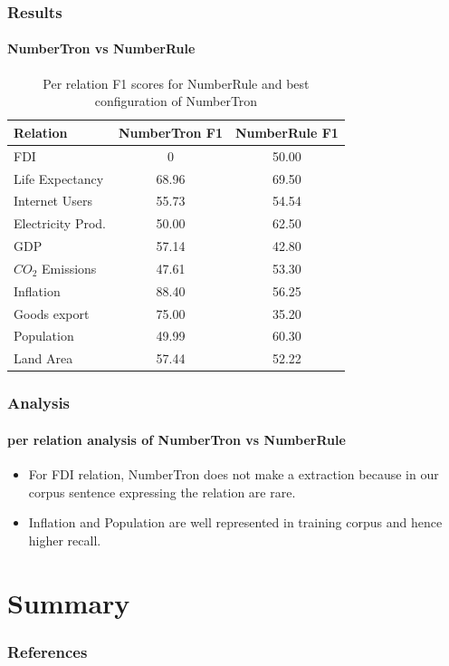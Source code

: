 \documentclass{beamer}
\begin{document}
\begin{frame}
\frametitle{Results}
\framesubtitle{NumberTron vs NumberRule}

\begin{table}
\begin{tabular}{|l|c|c|}
\hline
Relation & NumberTron F1 & NumberRule F1\\
\hline
\hline
FDI & 0 & 50.00\\
\hline
Life Expectancy & 68.96 & 69.50\\
\hline
Internet Users & 55.73 & 54.54\\
\hline
Electricity Prod. & 50.00 & 62.50\\
\hline
GDP & 57.14 & 42.80\\
\hline
$CO_{2}$ Emissions & 47.61 & 53.30\\
\hline
Inflation & 88.40 & 56.25\\
\hline
Goods export & 75.00 & 35.20\\
\hline
Population & 49.99 & 60.30\\
\hline
Land Area & 57.44 & 52.22\\
\hline
\end{tabular}
\caption{Per relation F1 scores for NumberRule and best configuration of NumberTron}
\label{tab:perrelscore}
\end{table}

\end{frame}
\begin{frame}
\frametitle{Analysis}
\framesubtitle{per relation analysis of NumberTron vs NumberRule}
\begin{itemize}
\setlength\itemsep{1em}
\item For FDI relation, NumberTron does not make a extraction because in our corpus sentence expressing the relation are rare.
\item Inflation and Population are well represented in training corpus and hence higher recall.
\end{itemize}
\end{frame}

\section{Summary}

\begin{frame}[allowframebreaks]
        \frametitle{References}
        
        
\end{frame}
\end{document}
